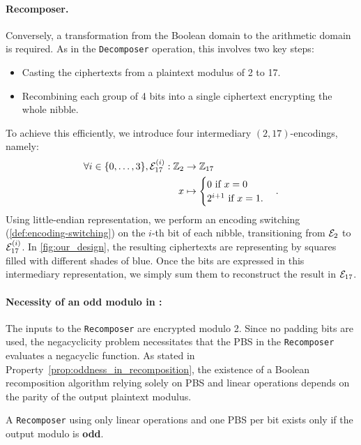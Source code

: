 \paragraph{Recomposer.} Conversely, a transformation from the Boolean domain to the arithmetic domain is required. As in the \texttt{Decomposer} operation, this involves two key steps:
\begin{itemize}
    \item Casting the ciphertexts from a plaintext modulus of 2 to 17.
    \item Recombining each group of 4 bits into a single ciphertext encrypting the whole nibble.
\end{itemize}
To achieve this efficiently, we introduce four intermediary $(2, 17)$-encodings, namely:
\begin{align*}
    \forall i \in \{0, \dots, 3\}, \mathcal{E}_{17}^{(i)}: \mathbb{Z}_2 &\rightarrow \mathbb{Z}_{17}\\
    x &\mapsto \begin{cases}
    0 \text{ if } x=0\\
    2^{i+1} \text{ if } x=1.
    \end{cases}.
\end{align*}
%
Using little-endian representation, we perform an encoding switching (\ref{def:encoding-switching}) on the $i$-th bit of each nibble, transitioning from $\mathcal{E}_2$ to $\mathcal{E}_{17}^{(i)}$. In \ref{fig:our_design}, the resulting ciphertexts are representing by squares filled with different shades of blue. Once the bits are expressed in this intermediary representation, we simply sum them to reconstruct the result in $\mathcal{E}_{17}$.

\paragraph{Necessity of an odd modulo in \SubBytes:} 
The inputs to the \texttt{Recomposer} are encrypted modulo 2. Since no padding bits are used, the negacyclicity problem necessitates that the PBS in the \texttt{Recomposer} evaluates a negacyclic function. As stated in Property~\ref{prop:oddness_in_recomposition}, the existence of a Boolean recomposition algorithm relying solely on PBS and linear operations depends on the parity of the output plaintext modulus.

\begin{property}
    A \texttt{Recomposer} using only linear operations and one PBS per bit exists only if the output modulo is \textbf{odd}.
    \label{prop:oddness_in_recomposition}
\end{property}


